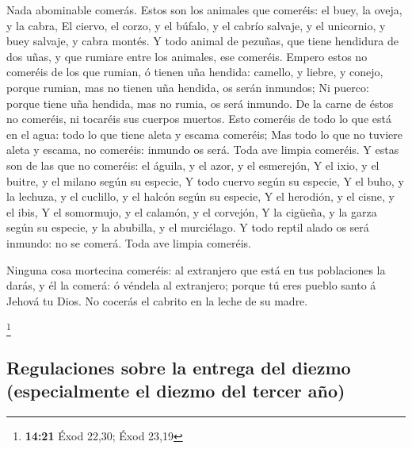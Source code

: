  Nada abominable comerás.  Estos son los
animales que comeréis: el buey, la oveja, y la cabra,  El
ciervo, el corzo, y el búfalo, y el cabrío salvaje, y el unicornio, y
buey salvaje, y cabra montés.  Y todo animal de pezuñas, que
tiene hendidura de dos uñas, y que rumiare entre los animales, ese
comeréis.  Empero estos no comeréis de los que rumian, ó
tienen uña hendida: camello, y liebre, y conejo, porque rumian, mas no
tienen uña hendida, os serán inmundos;  Ni puerco: porque
tiene uña hendida, mas no rumia, os será inmundo. De la carne de éstos
no comeréis, ni tocaréis sus cuerpos muertos.  Esto comeréis
de todo lo que está en el agua: todo lo que tiene aleta y escama
comeréis;  Mas todo lo que no tuviere aleta y escama, no
comeréis: inmundo os será.  Toda ave limpia comeréis.
 Y estas son de las que no comeréis: el águila, y el azor,
y el esmerejón,  Y el ixio, y el buitre, y el milano según
su especie,  Y todo cuervo según su especie, 
Y el buho, y la lechuza, y el cuclillo, y el halcón según su especie,
 Y el herodión, y el cisne, y el ibis,  Y el
somormujo, y el calamón, y el corvejón,  Y la cigüeña, y la
garza según su especie, y la abubilla, y el murciélago.  Y
todo reptil alado os será inmundo: no se comerá.  Toda ave
limpia comeréis.

 Ninguna cosa mortecina comeréis: al extranjero que está en
tus poblaciones la darás, y él la comerá: ó véndela al extranjero;
porque tú eres pueblo santo á Jehová tu Dios. No cocerás el cabrito en
la leche de su madre.

\footnote{\textbf{14:21} Éxod 22,30; Éxod 23,19}

\hypertarget{regulaciones-sobre-la-entrega-del-diezmo-especialmente-el-diezmo-del-tercer-auxf1o}{%
\subsection{Regulaciones sobre la entrega del diezmo (especialmente el
diezmo del tercer
año)}\label{regulaciones-sobre-la-entrega-del-diezmo-especialmente-el-diezmo-del-tercer-auxf1o}}

